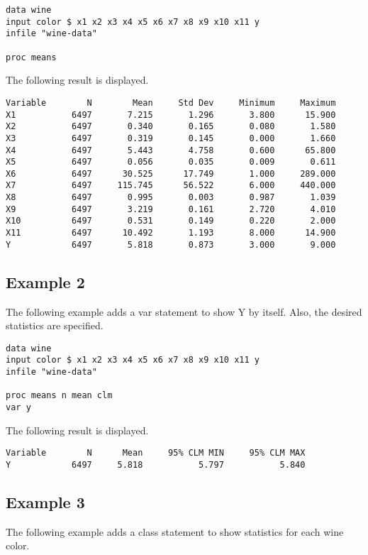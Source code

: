 \documentclass[12pt]{article}
\begin{document}
\begin{Verbatim}
data wine
input color $ x1 x2 x3 x4 x5 x6 x7 x8 x9 x10 x11 y
infile "wine-data"

proc means
\end{Verbatim}

The following result is displayed.

\begin{Verbatim}
Variable        N        Mean     Std Dev     Minimum     Maximum
X1           6497       7.215       1.296       3.800      15.900
X2           6497       0.340       0.165       0.080       1.580
X3           6497       0.319       0.145       0.000       1.660
X4           6497       5.443       4.758       0.600      65.800
X5           6497       0.056       0.035       0.009       0.611
X6           6497      30.525      17.749       1.000     289.000
X7           6497     115.745      56.522       6.000     440.000
X8           6497       0.995       0.003       0.987       1.039
X9           6497       3.219       0.161       2.720       4.010
X10          6497       0.531       0.149       0.220       2.000
X11          6497      10.492       1.193       8.000      14.900
Y            6497       5.818       0.873       3.000       9.000
\end{Verbatim}

\subsection*{Example 2}
The following example adds a var statement to show Y by itself.
Also, the desired statistics are specified.

\begin{Verbatim}
data wine
input color $ x1 x2 x3 x4 x5 x6 x7 x8 x9 x10 x11 y
infile "wine-data"

proc means n mean clm
var y
\end{Verbatim}

The following result is displayed.

\begin{Verbatim}
Variable        N      Mean     95% CLM MIN     95% CLM MAX
Y            6497     5.818           5.797           5.840
\end{Verbatim}

\subsection*{Example 3}
The following example adds a class statement
to show statistics for each wine color.
\end{document}
